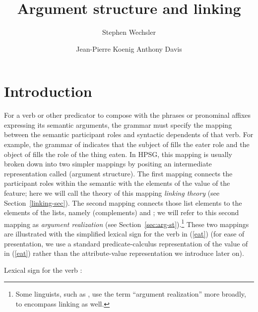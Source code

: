 \documentclass[output=paper
 	        ,biblatex
                ,babelshorthands
                ,newtxmath
                ,draftmode
                ,colorlinks, citecolor=brown
]{langscibook}
\author{%
	Stephen Wechsler\affiliation{The University of Texas}%
	\and Jean-Pierre Koenig\affiliation{University at Buffalo}%
	\lastand Anthony Davis\affiliation{Southern Oregon University}%
}
\title{Argument structure and linking}
\begin{document}
\maketitle
\label{chap:argumentstr}\label{chap-argumentstr}\label{chap-arg-st}


\section{Introduction}


For a verb or other predicator to compose with the phrases or pronominal affixes expressing its
semantic arguments, the grammar must specify the mapping between the semantic participant
roles and syntactic dependents
of that verb.  For example, the grammar of  indicates that the subject of 
fills the eater role and the object of   fills the role of the thing eaten.  In HPSG, this
mapping is usually broken down into two simpler mappings by positing an intermediate representation
called \argst (argument structure).  The first mapping connects the participant roles within the
semantic \content with the elements of the value of the \argst feature; here we will call the theory
of this mapping \emph{linking theory} (see Section~\ref{linking-sec}).  The second mapping connects
those \argst list elements to the elements of the  lists, namely \comps
(complements) and \subj {}; we will refer to this second mapping as
\emph{argument realization} (see Section~\ref{sec:arg-st}).\footnote{Some linguists, such as
  \citet{LevinandRappaport2005}, use the term ``argument realization'' more broadly, to encompass
  linking as well.}  
These two mappings are
illustrated with the simplified lexical sign for the verb  in (\ref{eat}) (for ease of
presentation, we use a standard predicate-calculus representation of the value of \content in
(\ref{eat}) rather than the attribute-value representation we introduce later on).  


\ea
\label{eat}
Lexical sign for the verb :\\
\z
\end{document}
